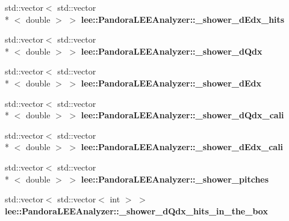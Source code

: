 \begin{DoxyCompactItemize}
\item 
\hypertarget{group__lee_ga8dc5bf5791d750d7481aa6a4051433d3}{std\-::vector$<$ std\-::vector\\*
$<$ double $>$ $>$ {\bfseries lee\-::\-Pandora\-L\-E\-E\-Analyzer\-::\-\_\-shower\-\_\-d\-Edx\-\_\-hits}}\label{group__lee_ga8dc5bf5791d750d7481aa6a4051433d3}

\item 
\hypertarget{group__lee_gaec600c2d05138143cbef4f23c44d92cf}{std\-::vector$<$ std\-::vector\\*
$<$ double $>$ $>$ {\bfseries lee\-::\-Pandora\-L\-E\-E\-Analyzer\-::\-\_\-shower\-\_\-d\-Qdx}}\label{group__lee_gaec600c2d05138143cbef4f23c44d92cf}

\item 
\hypertarget{group__lee_gab709b5ce1a5b80131bd14a57c2e82bf5}{std\-::vector$<$ std\-::vector\\*
$<$ double $>$ $>$ {\bfseries lee\-::\-Pandora\-L\-E\-E\-Analyzer\-::\-\_\-shower\-\_\-d\-Edx}}\label{group__lee_gab709b5ce1a5b80131bd14a57c2e82bf5}

\item 
\hypertarget{group__lee_gaaf81a95a1829c0041e9770be3d09f240}{std\-::vector$<$ std\-::vector\\*
$<$ double $>$ $>$ {\bfseries lee\-::\-Pandora\-L\-E\-E\-Analyzer\-::\-\_\-shower\-\_\-d\-Qdx\-\_\-cali}}\label{group__lee_gaaf81a95a1829c0041e9770be3d09f240}

\item 
\hypertarget{group__lee_gac413e11bfcca3b51ee4ab36ad94e68ba}{std\-::vector$<$ std\-::vector\\*
$<$ double $>$ $>$ {\bfseries lee\-::\-Pandora\-L\-E\-E\-Analyzer\-::\-\_\-shower\-\_\-d\-Edx\-\_\-cali}}\label{group__lee_gac413e11bfcca3b51ee4ab36ad94e68ba}

\item 
\hypertarget{group__lee_gaf56713e8dd07060973767857b7f8508f}{std\-::vector$<$ std\-::vector\\*
$<$ double $>$ $>$ {\bfseries lee\-::\-Pandora\-L\-E\-E\-Analyzer\-::\-\_\-shower\-\_\-pitches}}\label{group__lee_gaf56713e8dd07060973767857b7f8508f}

\item 
\hypertarget{group__lee_ga99371e105e8aa387ee0f0b548f788b57}{std\-::vector$<$ std\-::vector$<$ int $>$ $>$ {\bfseries lee\-::\-Pandora\-L\-E\-E\-Analyzer\-::\-\_\-shower\-\_\-d\-Qdx\-\_\-hits\-\_\-in\-\_\-the\-\_\-box}}\label{group__lee_ga99371e105e8aa387ee0f0b548f788b57}


\end{DoxyCompactItemize}
